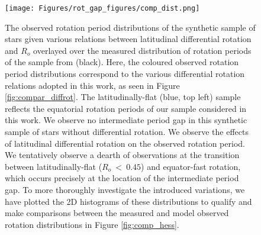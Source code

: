 \begin{figure}
\centering
 \texttt{[image: Figures/rot\_gap\_figures/comp\_dist.png]}
 \caption[The observed rotation period distributions of the synthetic sample of stars given various relations between latitudinal differential rotation and $R_o$ overlayed over the distribution of measured rotation periods of the \kepler{} sample from \citet{mcquillan_rotation_2014}.]{
 	The observed rotation period distributions of the synthetic sample of stars given various relations between latitudinal differential rotation and $R_o$ overlayed over the measured distribution of rotation periods of the \kepler{} sample from \citet{mcquillan_rotation_2014} (black). Here, the coloured observed rotation period distributions correspond to the various differential rotation relations adopted in this work, as seen in Figure \ref{fig:compar_diffrot}. The latitudinally-flat (blue, top left) sample reflects the equatorial rotation periods of our sample considered in this work. We observe no intermediate period gap in this synthetic sample of stars without differential rotation. 
We observe the effects of latitudinal differential rotation on the observed rotation period. We tentatively observe a dearth of observations at the transition between latitudinally-flat ($R_o \ < \ 0.45$) and equator-fast rotation, which occurs precisely at the location of the intermediate period gap.
To more thoroughly investigate the introduced variations, we have plotted the 2D histograms of these distributions to qualify and make comparisons between the measured and model observed rotation distributions in Figure \ref{fig:comp_hess}.}
 \label{fig:comp_dist}
\end{figure}

